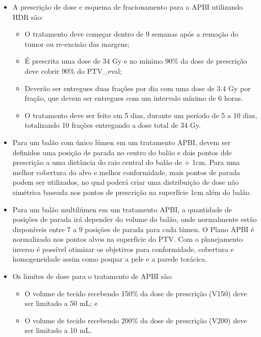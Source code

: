 \documentclass[11pt,a4paper]{article}
\newcounter{exemplo}
\begin{document}
\begin{exemplo}[8. Braquiterapia]
\begin{itemize}
        \item A prescrição de dose e esquema de fracionamento para a APBI utilizando HDR são:
        
            \begin{itemize}
                \item O tratamento deve começar dentro de 9 semanas após a remoção do tumor ou re-excisão das margens;
                \item É prescrita uma dose de 34 Gy e no mínimo 90\% da dose de prescrição deve cobrir 90\% do PTV\_eval;
                \item Deverão ser entregues duas frações por dia com uma dose de 3.4 Gy por fração, que devem ser entregues com um intervalo mínimo de 6 horas.
                \item O tratamento deve ser feito em 5 dias, durante um período de 5 a 10 dias, totalizando 10 frações entregando a dose total de 34 Gy.
            \end{itemize}

        \item Para um balão com único lúmen em um tratamento APBI, devem ser definidos uma posição de parada no centro do balão e dois pontos dde prescrição a uma distância do raio central do balão de + 1cm. Para uma melhor cobertura do alvo e melhor conformidade, mais pontos de parada podem ser utilizados, no qual poderá criar uma distribuição de dose não simétrica baseada nos pontos de prescrição na superfície 1cm além do balão.
        
        \item Para um balão multilúmen em um tratamento APBI, a quantidade de posições de parada irá depender do volume do balão, onde normalmente estão disponíveis entre 7 a 9 posições de parada  para cada lúmen. O Plano APBI é normalizado nos pontos alvos na superfície do PTV. Com o planejamento inverso é possível otimizar os objetivos para conformidade, cobertura e homogeneidade assim como poupar a pele e a parede torácica.
        
        \item Os limites de dose para o tratamento de APBI são:
            \begin{itemize}
                \item O volume de tecido recebendo 150\% da dose de prescrição (V150) deve ser limitado a 50 mL; e
                \item O volume de tecido recebendo 200\% da dose de prescrição (V200) deve ser limitado a 10 mL.
            \end{itemize}
        

\end{itemize}
\end{exemplo}
\end{document}
